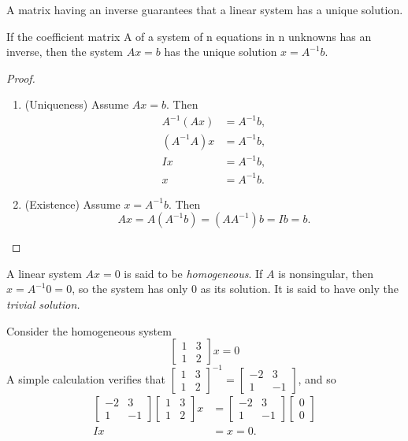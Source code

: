 \documentclass[../main.tex]{subfiles}
\begin{document}
A matrix having an inverse guarantees that a linear system has a unique solution.


\begin{theorem}
	\label{theo:theo_1_5}
	If the coefficient matrix A of a system of n equations in n unknowns has an inverse, then the system $A x=b$ has the unique solution $x=A^{-1} b$.
\end{theorem}

\begin{proof}
	\begin{enumerate}[label=\textbf{\arabic*}]
\item (Uniqueness) Assume $A x=b$. Then
$$
\begin{aligned}
A^{-1}(A x) &=A^{-1} b, \\
\left(A^{-1} A\right) x &=A^{-1} b, \\
I x &=A^{-1} b, \\
x &=A^{-1} b .
\end{aligned}
$$
\item (Existence) Assume $x=A^{-1} b$. Then
$$
A x=A\left(A^{-1} b\right)=\left(A A^{-1}\right) b=I b=b .
$$
\end{enumerate}
\end{proof}

A linear system $A x=0$ is said to be \emph{homogeneous}. If $A$ is nonsingular, then $x=A^{-1} 0=0$, so the system has only 0 as its solution. It is said to have only the \emph{trivial solution.}

\begin{example} Consider the homogeneous system
$$
\left[\begin{array}{ll}
1 & 3 \\
1 & 2
\end{array}\right] x=0
$$
A simple calculation verifies that $\left[\begin{array}{ll}1 & 3 \\ 1 & 2\end{array}\right]^{-1}=\left[\begin{array}{cc}-2 & 3 \\ 1 & -1\end{array}\right]$, and so
$$
\begin{aligned}
\left[\begin{array}{cc}
-2 & 3 \\
1 & -1
\end{array}\right]\left[\begin{array}{ll}
1 & 3 \\
1 & 2
\end{array}\right] x &=\left[\begin{array}{cc}
-2 & 3 \\
1 & -1
\end{array}\right]\left[\begin{array}{l}
0 \\
0
\end{array}\right] \\
I x &=x=0 .
\end{aligned}
$$
\end{example}
\end{document}
